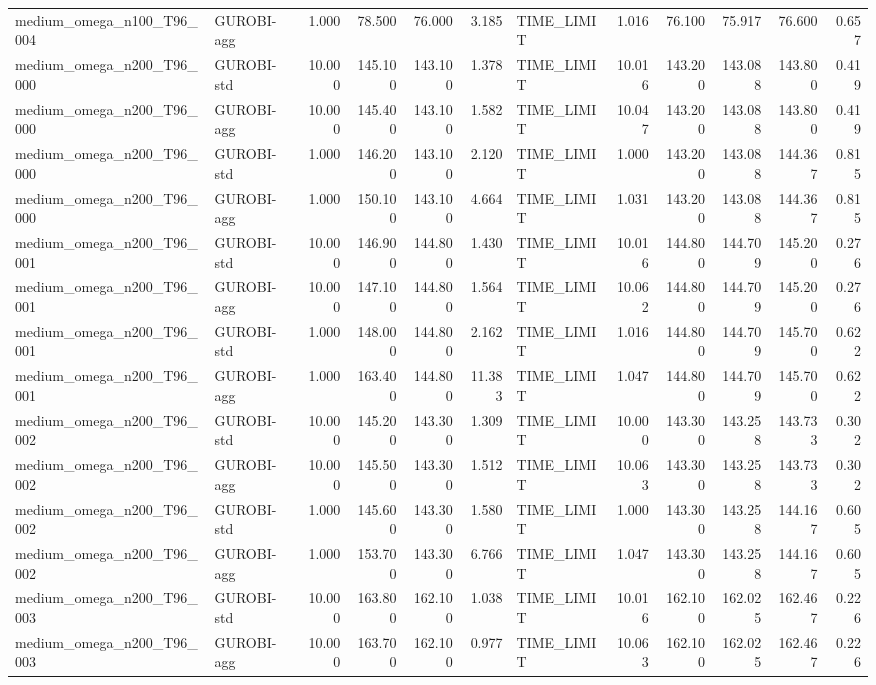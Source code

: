 \begin{table}[htbp]
\begin{tabular}{llrrrrlrrrrr}
medium\_omega\_n100\_T96\_004 & GUROBI-agg & 1.000 & 78.500 & 76.000 & 3.185 & TIME\_LIMIT & 1.016 & 76.100 & 75.917 & 76.600 & 0.657 \\
medium\_omega\_n200\_T96\_000 & GUROBI-std & 10.000 & 145.100 & 143.100 & 1.378 & TIME\_LIMIT & 10.016 & 143.200 & 143.088 & 143.800 & 0.419 \\
medium\_omega\_n200\_T96\_000 & GUROBI-agg & 10.000 & 145.400 & 143.100 & 1.582 & TIME\_LIMIT & 10.047 & 143.200 & 143.088 & 143.800 & 0.419 \\
medium\_omega\_n200\_T96\_000 & GUROBI-std & 1.000 & 146.200 & 143.100 & 2.120 & TIME\_LIMIT & 1.000 & 143.200 & 143.088 & 144.367 & 0.815 \\
medium\_omega\_n200\_T96\_000 & GUROBI-agg & 1.000 & 150.100 & 143.100 & 4.664 & TIME\_LIMIT & 1.031 & 143.200 & 143.088 & 144.367 & 0.815 \\
medium\_omega\_n200\_T96\_001 & GUROBI-std & 10.000 & 146.900 & 144.800 & 1.430 & TIME\_LIMIT & 10.016 & 144.800 & 144.709 & 145.200 & 0.276 \\
medium\_omega\_n200\_T96\_001 & GUROBI-agg & 10.000 & 147.100 & 144.800 & 1.564 & TIME\_LIMIT & 10.062 & 144.800 & 144.709 & 145.200 & 0.276 \\
medium\_omega\_n200\_T96\_001 & GUROBI-std & 1.000 & 148.000 & 144.800 & 2.162 & TIME\_LIMIT & 1.016 & 144.800 & 144.709 & 145.700 & 0.622 \\
medium\_omega\_n200\_T96\_001 & GUROBI-agg & 1.000 & 163.400 & 144.800 & 11.383 & TIME\_LIMIT & 1.047 & 144.800 & 144.709 & 145.700 & 0.622 \\
medium\_omega\_n200\_T96\_002 & GUROBI-std & 10.000 & 145.200 & 143.300 & 1.309 & TIME\_LIMIT & 10.000 & 143.300 & 143.258 & 143.733 & 0.302 \\
medium\_omega\_n200\_T96\_002 & GUROBI-agg & 10.000 & 145.500 & 143.300 & 1.512 & TIME\_LIMIT & 10.063 & 143.300 & 143.258 & 143.733 & 0.302 \\
medium\_omega\_n200\_T96\_002 & GUROBI-std & 1.000 & 145.600 & 143.300 & 1.580 & TIME\_LIMIT & 1.000 & 143.300 & 143.258 & 144.167 & 0.605 \\
medium\_omega\_n200\_T96\_002 & GUROBI-agg & 1.000 & 153.700 & 143.300 & 6.766 & TIME\_LIMIT & 1.047 & 143.300 & 143.258 & 144.167 & 0.605 \\
medium\_omega\_n200\_T96\_003 & GUROBI-std & 10.000 & 163.800 & 162.100 & 1.038 & TIME\_LIMIT & 10.016 & 162.100 & 162.025 & 162.467 & 0.226 \\
medium\_omega\_n200\_T96\_003 & GUROBI-agg & 10.000 & 163.700 & 162.100 & 0.977 & TIME\_LIMIT & 10.063 & 162.100 & 162.025 & 162.467 & 0.226 \\

\end{tabular}
\end{table}
